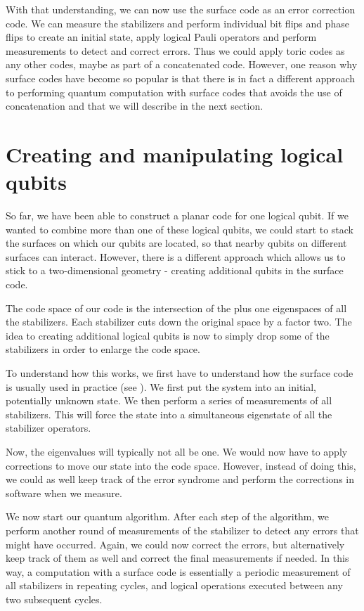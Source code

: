 \documentclass[a4paper, draft]{article}
\theoremstyle{own}
\theoremstyle{remark}
\begin{document}
With that understanding, we can now use the surface code as an error correction code. We can measure the stabilizers and perform individual bit flips and phase flips to create an initial state, apply logical Pauli operators and perform measurements to detect and correct errors. Thus we could apply toric codes as any other codes, maybe as part of a concatenated code. However, one reason why surface codes have become so popular is that there is in fact a different approach to performing quantum computation with surface codes that avoids the use of concatenation and that we will describe in the next section.

\section{Creating and manipulating logical qubits}

So far, we have been able to construct a planar code for one logical qubit. If we wanted to combine more than one of these logical qubits, we could start to stack the surfaces on which our qubits are located, so that nearby qubits on different surfaces can interact. However, there is a different approach which allows us to stick to a two-dimensional geometry - creating additional qubits in the surface code.

The code space of our code is the intersection of the plus one eigenspaces of all the stabilizers. Each stabilizer cuts down the original space by a factor two. The idea to creating additional logical qubits is now to simply drop some of the stabilizers in order to enlarge the code space.

To understand how this works, we first have to understand how the surface code is usually used in practice (see \cite{SurfaceCodes}). We first put the system into an initial, potentially unknown state. We then perform a series of measurements of all stabilizers. This will force the state into a simultaneous eigenstate of all the stabilizer operators.

Now, the eigenvalues will typically not all be one. We would now have to apply corrections to move our state into the code space. However, instead of doing this, we could as well keep track of the error syndrome and perform the corrections in software when we measure. 

We now start our quantum algorithm. After each step of the algorithm, we perform another round of measurements of the stabilizer to detect any errors that might have occurred. Again, we could now correct the errors, but alternatively keep track of them as well and correct the final measurements if needed. In this way, a computation with a surface code is essentially a periodic measurement of all stabilizers in repeating cycles, and logical operations executed between any two subsequent cycles.
\end{document}
